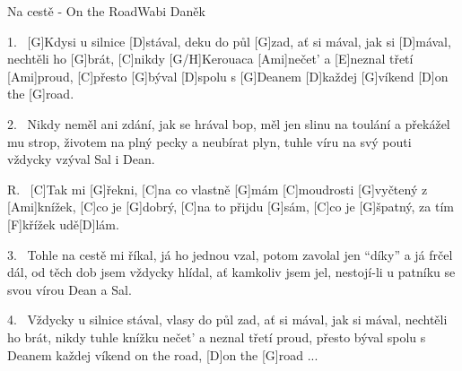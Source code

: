 \begin{song}{Na cestě - On the Road}{Wabi Daněk}


\begin{xverse}{1.~}
[G]Kdysi u silnice [D]stával, deku do půl [G]zad,
ať si mával, jak si [D]mával, nechtěli ho [G]brát,
[C]nikdy [G/H]Kerouaca [Ami]nečet' a [E]neznal třetí [Ami]proud,
[C]přesto [G]býval [D]spolu s [G]Deanem [D]každej [G]víkend [D]on the [G]road.
\end{xverse}

\begin{xverse}{2.~}
Nikdy neměl ani zdání, jak se hrával bop,
měl jen slinu na toulání a překážel mu strop,
životem na plný pecky a neubírat plyn,
tuhle víru na svý pouti vždycky vzýval Sal i Dean.
\end{xverse}

\begin{xverse}{R.~}
[C]Tak mi [G]{}řekni, [C]na co vlastně [G]mám
[C]moudrosti [G]vyčtený z [Ami]knížek,
[C]co je [G]dobrý, [C]na to přijdu [G]sám,
[C]co je [G]{}špatný, za tím [F]křížek udě[D]lám.
\end{xverse}

\begin{xverse}{3.~}
Tohle na cestě mi říkal, já ho jednou vzal,
potom zavolal jen ``díky'' a já frčel dál,
od těch dob jsem vždycky hlídal, ať kamkoliv jsem jel,
nestojí-li u patníku se svou vírou Dean a Sal.
\end{xverse}

\begin{xverse}{4.~}
Vždycky u silnice stával, vlasy do půl zad,
ať si mával, jak si mával, nechtěli ho brát,
nikdy tuhle knížku nečet' a neznal třetí proud,
přesto býval spolu s Deanem každej víkend on the road,
[D]on the [G]road ...
\end{xverse}

\end{song}

